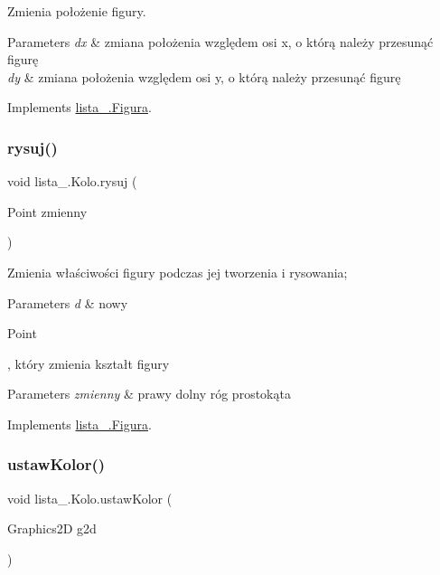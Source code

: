 Zmienia położenie figury. 
\begin{DoxyParams}{Parameters}
{\em dx} & zmiana położenia względem osi x, o którą należy przesunąć figurę \\
\hline
{\em dy} & zmiana położenia względem osi y, o którą należy przesunąć figurę\\
\hline
\end{DoxyParams}
 

Implements \mbox{\hyperlink{interfacelista__5_1_1_figura_a72f085618cf604e8b1632ea733043861}{lista\+\_.\+Figura}}.

\mbox{\label{classlista__5_1_1_kolo_acf743c21951288b8794d613665048610}} 
\subsubsection{\texorpdfstring{rysuj()}{rysuj()}}
{\footnotesize\ttfamily void lista\+\_.\+Kolo.\+rysuj (\begin{DoxyParamCaption}\item[{Point}]{zmienny }\end{DoxyParamCaption})}

Zmienia właściwości figury podczas jej tworzenia i rysowania; 
\begin{DoxyParams}{Parameters}
{\em d} & nowy
\begin{DoxyCode}
Point 
\end{DoxyCode}
 , który zmienia kształt figury\\
\hline
\end{DoxyParams}
 
\begin{DoxyParams}{Parameters}
{\em zmienny} & prawy dolny róg prostokąta \\
\hline
\end{DoxyParams}


Implements \mbox{\hyperlink{interfacelista__5_1_1_figura_a1b238957bac675c57febc970067dfd6d}{lista\+\_.\+Figura}}.

\mbox{\label{classlista__5_1_1_kolo_a97e188acce92c4ca26f1e5483370b00f}} 
\subsubsection{\texorpdfstring{ustaw\+Kolor()}{ustawKolor()}}
{\footnotesize\ttfamily void lista\+\_.\+Kolo.\+ustaw\+Kolor (\begin{DoxyParamCaption}\item[{Graphics2D}]{g2d }\end{DoxyParamCaption})}


